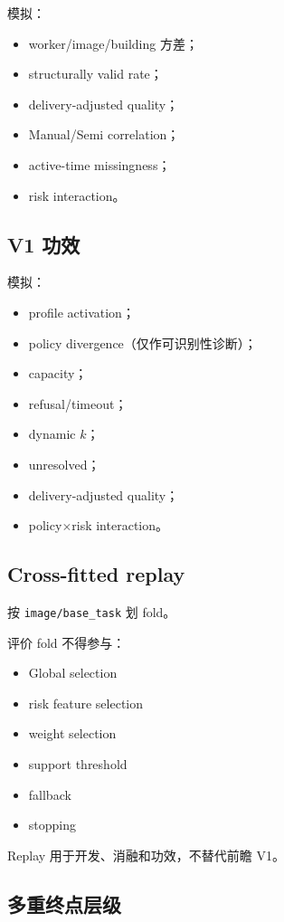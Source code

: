 模拟：
\begin{itemize}
  \item worker/image/building 方差；
  \item structurally valid rate；
  \item delivery-adjusted quality；
  \item Manual/Semi correlation；
  \item active-time missingness；
  \item risk interaction。
\end{itemize}

\subsection{V1 功效}

模拟：
\begin{itemize}
  \item profile activation；
  \item policy divergence（仅作可识别性诊断）；
  \item capacity；
  \item refusal/timeout；
  \item dynamic \(k\)；
  \item unresolved；
  \item delivery-adjusted quality；
  \item policy\(\times\)risk interaction。
\end{itemize}

\subsection{Cross-fitted replay}

按 \texttt{image/base\_task} 划 fold。

评价 fold 不得参与：
\begin{itemize}
  \item Global selection
  \item risk feature selection
  \item weight selection
  \item support threshold
  \item fallback
  \item stopping
\end{itemize}

Replay 用于开发、消融和功效，不替代前瞻 V1。

\subsection{多重终点层级}

